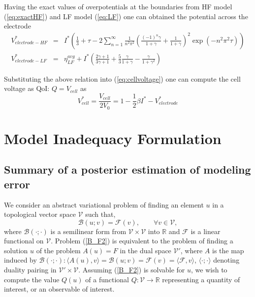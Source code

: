 \documentclass[]{article}
\begin{document}
Having the exact values of overpotentials at the boundaries from HF model (\ref{eq:exactHF}) and LF model (\ref{eq:LF}) one can obtained the potential across the electrode 
%
\begin{eqnarray}\label{eq:Velec_HF_LF}
V^*_{electrode-HF} &=&  I^* \left( \frac{1}{3} +\tau - 2 \sum_{n=1}^\infty \frac{1}{n^2\pi^2}\left(\frac{(-1)^n\gamma}{1+\gamma} + \frac{1}{1+\gamma} \right)^2 \exp (-n^2\pi^2\tau)  \right)\\
V^*_{electrode-LF} &=&   \eta_{LF}^{avg} + I^*\left(  \frac{2\gamma+1}{3\gamma+1} + \frac{5}{3}\frac{\gamma}{1+\gamma} - \frac{\gamma}{1+\gamma^2} \right)
\end{eqnarray}

Substituting the above relation into (\ref{eq:cellvoltage}) one can compute the cell voltage as QoI: $Q = V_{cell}$ as
%
\begin{equation}\label{eq:Vcell}
V_{cell}^* = \frac{V_{cell}}{2V_0} = 1 - \frac{1}{2}\beta I^* - V^*_{electrode}
\end{equation}
%

\section{Model Inadequacy Formulation}

\subsection{Summary of a posterior estimation of modeling error}
We consider an abstract variational problem of finding an element $u$ in a topological vector space $\mathcal{V}$ such that,
%
\begin{equation}\label{B_F2}
\mathcal{B} (u ; v) = \mathcal{F}(v), \qquad \forall v \in \mathcal{V},
\end{equation}
%
%
where $\mathcal{B(\cdot ; \cdot)}$ is a semilinear form from $\mathcal{V} \times \mathcal{V}$ into $\mathbb{R}$ and $\mathcal{F}$ is a linear functional on $\mathcal{V}$. Problem (\ref{B_F2}) is equivalent to the problem of finding a solution $u$ of the problem $A(u)=F$ in the dual space $\mathcal{V}'$, where $A$ is the map induced by $\mathcal{B(\cdot ; \cdot)} : \langle A(u),v \rangle = \mathcal{B} (u ; v) = \mathcal{F}(v) = \langle \mathcal{F}, v \rangle$, $\langle \cdot ; \cdot\rangle$ denoting duality pairing in $\mathcal{V}' \times \mathcal{V}$.
Assuming (\ref{B_F2}) is solvable for $u$, we wish to compute the value $Q(u)$ of a functional $Q: \mathcal{V} \rightarrow \mathbb{R}$ representing a quantity of interest, or an observable of interest.
\end{document}
